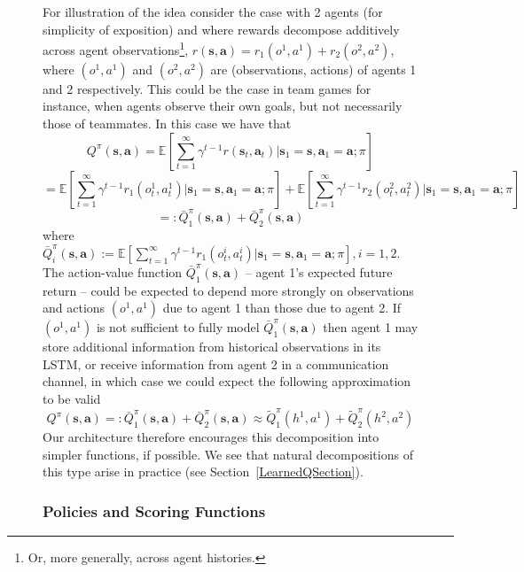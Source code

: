 \documentclass{article}
\def\E{{\mathbb E}} %
\def\bs{{\mathbf{s}}}
\def\ba{{\mathbf{a}}}
\begin{document}
\begin{figure}
For illustration of the idea consider the case with 2 agents (for simplicity of exposition) and where rewards decompose additively across agent observations\footnote{Or, more generally, across agent histories.}, $r(\bs,\ba)=r_1(o^1,a^1)+r_2(o^2,a^2)$, where $(o^1, a^1)$ and $(o^2, a^2)$ are (observations, actions) of agents 1 and 2 respectively. This could be the case in team games for instance, when agents observe their own goals, but not necessarily those of teammates. In this case we have that
$$
Q^\pi(\bs,\ba) = \E [ \sum_{t=1}^\infty \gamma^{t-1} r(\bs_t,\ba_t) | \bs_1 = \bs, \ba_1 = \ba; \pi   ] \nonumber $$ $$
=\E [ \sum_{t=1}^\infty \gamma^{t-1} r_1(o^1_t,a^1_t) | \bs_1 = \bs, \ba_1 = \ba; \pi   ] + \E [ \sum_{t=1}^\infty \gamma^{t-1} r_2(o^2_t,a^2_t) | \bs_1 = \bs, \ba_1 = \ba; \pi   ] \nonumber $$ $$
 =: \bar{Q}^\pi_1(\bs,\ba) + \bar{Q}^\pi_2(\bs,\ba) \nonumber
$$
where $\bar{Q}^\pi_i(\bs,\ba):= \E [ \sum_{t=1}^\infty \gamma^{t-1} r_1(o^i_t,a^i_t) | \bs_1 = \bs, \ba_1 = \ba; \pi   ], i=1,2$. 
The action-value function $\bar{Q}^\pi_1(\bs,\ba)$ -- agent 1's expected future return -- could be expected to depend more strongly on observations and actions $(o^1, a^1)$ due to agent 1 than those due to agent 2. If $(o^1, a^1)$ is not sufficient to fully model $\bar{Q}^\pi_1(\bs,\ba)$ then agent 1 may store additional information from historical observations in its LSTM, or receive information from agent 2 in a communication channel, in which case we could expect the following approximation to be valid
$$
Q^\pi(\bs,\ba) =: \bar{Q}^\pi_1(\bs,\ba) + \bar{Q}^\pi_2(\bs,\ba)  \approx \tilde Q^\pi_1(h^1,a^1) + \tilde Q^\pi_2(h^2,a^2) 
$$
Our architecture therefore encourages this decomposition into simpler functions, if possible. We see that natural decompositions of this type arise in practice (see Section~\ref{LearnedQSection}).


\iffalse
\subsubsection{Policies and Scoring Functions}


\end{figure}
\end{document}
